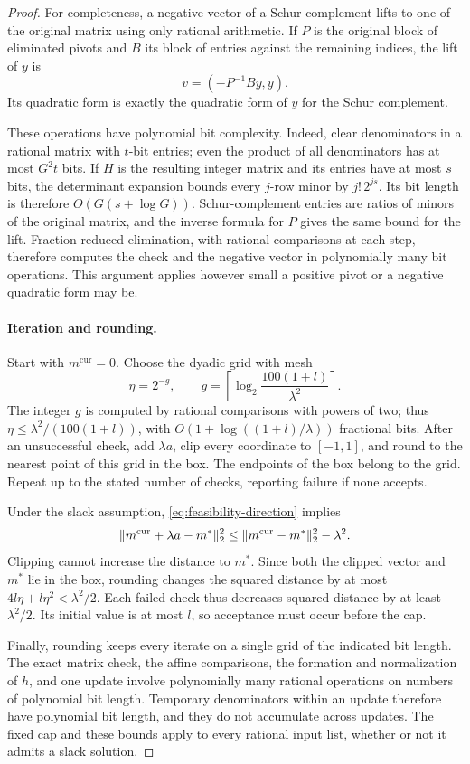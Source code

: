 \begin{proof}
For completeness, a negative vector of a Schur complement lifts to
one of the original matrix using only rational arithmetic.  If \(P\)
is the original block of eliminated pivots and \(B\) its block of
entries against the remaining indices, the lift of \(y\) is
\[
 v=(-P^{-1}By,y).
\]
Its quadratic form is exactly the quadratic form of \(y\) for the
Schur complement.

These operations have polynomial bit complexity.  Indeed, clear
denominators in a rational matrix with \(t\)-bit entries; even the
product of all denominators has at most \(G^2t\) bits.  If \(H\) is
the resulting integer matrix and its entries have at most \(s\) bits,
the determinant expansion bounds every \(j\)-row minor by
\(j!\,2^{js}\).  Its bit length is therefore \(O(G(s+\log G))\).
Schur-complement entries are ratios of minors of the original matrix,
and the inverse formula for \(P\) gives the same bound for the lift.
Fraction-reduced elimination, with rational comparisons at each step,
therefore computes the check and the negative vector in polynomially
many bit operations.  This argument applies however small a positive
pivot or a negative quadratic form may be.

\paragraph{Iteration and rounding.}
Start with \(m^{\mathrm{cur}}=0\).  Choose the dyadic grid with mesh
\[
 \eta=2^{-g},\qquad
 g=\left\lceil\log_2\frac{100(1+l)}{\lambda^2}\right\rceil.
\]
The integer \(g\) is computed by rational comparisons with powers of
two; thus \(\eta\le\lambda^2/(100(1+l))\), with
\(O(1+\log((1+l)/\lambda))\) fractional bits.  After an
unsuccessful check, add \(\lambda a\), clip every coordinate to
\([-1,1]\), and round to the nearest point of this grid in the box.
The endpoints of the box belong to the grid.  Repeat up to the
stated number of checks, reporting failure if none accepts.

Under the slack assumption, \eqref{eq:feasibility-direction} implies
\[
 \lVert m^{\mathrm{cur}}+\lambda a-m^*\rVert_2^2
 \le \lVert m^{\mathrm{cur}}-m^*\rVert_2^2-\lambda^2.
\]
Clipping cannot increase the distance to \(m^*\).  Since both the
clipped vector and \(m^*\) lie in the box, rounding changes the squared
distance by at most \(4l\eta+l\eta^2<\lambda^2/2\).  Each failed check
thus decreases squared distance by at least \(\lambda^2/2\).
Its initial value is at most \(l\), so acceptance must occur before
the cap.

Finally, rounding keeps every iterate on a single grid of the indicated
bit length.  The exact matrix check, the affine comparisons, the
formation and normalization of \(h\), and one update involve
polynomially many rational operations on numbers of polynomial bit
length.  Temporary denominators within an update therefore have
polynomial bit length, and they do not accumulate across updates.
The fixed cap and these bounds apply to every rational input list,
whether or not it admits a slack solution.
\end{proof}

